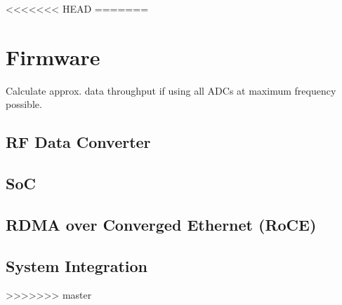 <<<<<<< HEAD
=======
\section{Firmware}
Calculate approx. data throughput if using all ADCs at maximum frequency possible.
\subsection{RF Data Converter}
\subsection{SoC}
\subsection{RDMA over Converged Ethernet (RoCE)}

\subsection{System Integration}


>>>>>>> master
